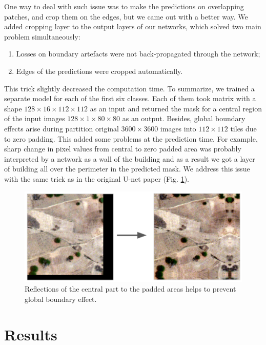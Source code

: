 \documentclass[10pt,twocolumn,letterpaper]{article}
\begin{document}
One way to deal with such issue was to make the predictions on overlapping patches, and crop them on the edges, but we came out with a better way. We added cropping layer to the output layers of our networks, which solved two main problem simultaneously:

\begin{enumerate}
	\item Losses on boundary artefacts were not back-propagated through the network;
	\item Edges of the predictions were cropped automatically.
\end{enumerate}

This trick slightly decreased the computation time. To summarize, we trained a separate model for each of the first six classes. Each of them took matrix with a shape $128 \times 16 \times 112 \times 112$ as an input and returned the mask for a central region of the input images $128 \times 1 \times 80 \times 80$ as an output. Besides, global boundary effects arise during partition original $3600 \times 3600$ images into $112 \times 112$ tiles due to zero padding. This added some problems at the prediction time. For example, sharp change in pixel values from central to zero padded area was probably interpreted by a network as a wall of the building and as a result we got a layer of building all over the perimeter in the predicted mask. We address this issue with the same trick as in the original U-net paper \cite{unet} (Fig. \ref{fig:boundary2}).

\begin{figure}[!h]
	\captionsetup{justification=centering}
	\centering
	\includegraphics[scale=0.21]{boundary2}
	\caption{Reflections of the central part to the padded areas helps to prevent global boundary effect.}
	\label{fig:boundary2}
\end{figure}


\section{Results}
\end{document}
